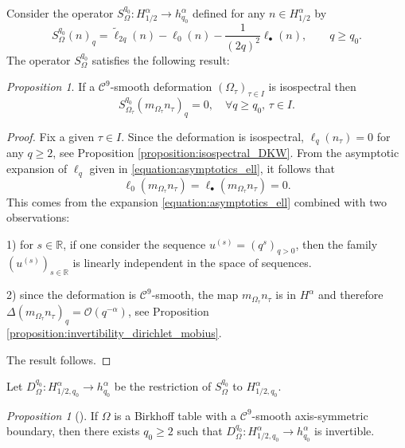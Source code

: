 \documentclass[12pt, openany]{amsart}
\theoremstyle{definition}
\theoremstyle{remark}
\theoremstyle{remark}
\theoremstyle{theorem}
\theoremstyle{theorem}
\theoremstyle{theorem}
\newtheorem{proposition}[theorem]{Proposition}
\theoremstyle{theorem}
\newcommand{\RR}{\mathbb{R}}
\begin{document}
Consider the operator $S_{\Omega}^{q_0}:H^{\alpha}_{1/2}\to h^{\alpha}_{q_0}$ defined for any $n\in H^{\alpha}_{1/2}$ by
\[
S_{\Omega}^{q_0}(n)_q = \tilde \ell_{2q}(n) - \ell_0(n)-\frac{1}{(2q)^2}\ell_{\bullet}(n),\qquad q\geq q_0.
\]
The operator $S_{\Omega}^{q_0}$ satisfies the following result:
\begin{proposition} {If a $\mathscr C^9$-smooth} deformation $(\Omega_{\tau})_{\tau\in I}$ is isospectral then
\begin{equation}
S_{\Omega_{\tau}}^{q_0}\left(m_{\Omega_{\tau}}n_{\tau}\right)_q = 0,\quad\forall q\geq q_0,\,\tau\in I.
\end{equation}
\end{proposition}

\begin{proof}
Fix a given $\tau\in I$. Since the deformation is isospectral, $\ell_q(n_{\tau}) = 0$ for any $q\geq 2$, see Proposition \ref{proposition:isospectral_DKW}. From the asymptotic expansion of $\ell_q$ given in \eqref{equation:asymptotics_ell}, it follows that 
\[
\ell_0(m_{\Omega_{\tau}}n_{\tau})=\ell_{\bullet}(m_{\Omega_{\tau}}n_{\tau})=0.
\]
This comes from the expansion \eqref{equation:asymptotics_ell} combined with two observations: 

1) for $s\in\RR$, if one consider the sequence $u^{(s)} = (q^{s})_{q>0}$, then the family $(u^{(s)}) _{s\in\RR}$ is linearly independent in the space of sequences.

2) since the deformation is $\mathscr C^9$-smooth, the map $m_{\Omega_{\tau}}n_{\tau}$ is in $H^{\alpha}$ and therefore $\Delta(m_{\Omega_{\tau}}n_{\tau})_q=\mathcal{O}(q^{-\alpha})$, see Proposition \ref{proposition:invertibility_dirichlet_mobius}. 

The result follows.
\end{proof}


Let $D_{\Omega}^{q_0}:H^{\alpha}_{1/2,q_0}\to h^{\alpha}_{q_0}$ be the restriction of $S_{\Omega}^{q_0}$ to $H^{\alpha}_{1/2,q_0}$.

\begin{proposition}[\cite{DKW}]
\label{proposition:inveritbility_DKW}
If $\Omega$ is a Birkhoff table with a $\mathscr C^9$-smooth axis-symmetric boundary, then there exists $q_0\geq 2$ such that $D_{\Omega}^{q_0}:H^{\alpha}_{1/2,q_0}\to h^{\alpha}_{q_0}$ is invertible.
\end{proposition}
\end{document}
